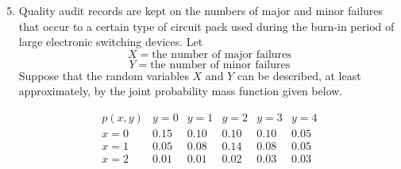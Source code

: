 \documentclass{report}
\begin{document}
 
 \pagebreak \bigbreak \noindent 
\begin{mdframed}
\begin{enumerate}[label=\arabic*.]
    \setcounter{enumi}{4}
    \item Quality audit records are kept on the numbers of major and minor failures that occur to a certain type of circuit pack used during the burn-in period of large electronic switching devices. Let 
    \[ X = \text{the number of major failures} \]
    \[ Y = \text{the number of minor failures} \]
    Suppose that the random variables \( X \) and \( Y \) can be described, at least approximately, by the joint probability mass function given below.

    \[
    \begin{array}{c|ccccc}
    p(x, y) & y = 0 & y = 1 & y = 2 & y = 3 & y = 4 \\ \hline
    x = 0 & 0.15 & 0.10 & 0.10 & 0.10 & 0.05 \\
    x = 1 & 0.05 & 0.08 & 0.14 & 0.08 & 0.05 \\
    x = 2 & 0.01 & 0.01 & 0.02 & 0.03 & 0.03 \\
    \end{array}
    \]


\end{enumerate}
\end{mdframed}
\end{document}
